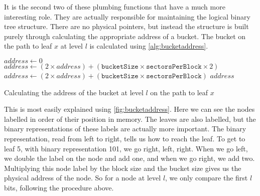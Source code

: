 \documentclass[12pt,a4paper,twoside,openright]{report}
\begin{document}
It is the second two of these plumbing functions that have a much more interesting role. They are actually responsible for maintaining the logical binary tree structure. There are no physical pointers, but instead the structure is built purely through calculating the appropriate address of a bucket. The bucket on the path to leaf $x$ at level $l$ is calculated using \cref{alg:bucketaddress}.

\begin{algorithm}[H]
  \begin{algorithmic}
  \vskip 10pt
      \State $address \gets 0$
          \State $address \gets (2 \times address) + (\mathtt{bucketSize} \times \mathtt{sectorsPerBlock} \times 2)$
        \Else
          \State $address \gets (2 \times address) + (\mathtt{bucketSize} \times \mathtt{sectorsPerBlock})$
        \EndIf
      \EndFor
      \State \Return $address$
    \EndFunction
  \vskip 10pt
  \end{algorithmic}
  \caption{Calculating the address of the bucket at level $l$ on the path to leaf $x$}
  \label{alg:bucketaddress}
\end{algorithm}

This is most easily explained using \cref{fig:bucketaddress}. Here we can see the nodes labelled in order of their position in memory. The leaves are also labelled, but the binary representations of these labels are actually more important. The binary representation, read from left to right, tells us how to reach the leaf. To get to leaf 5, with binary representation 101, we go right, left, right. When we go left, we double the label on the node and add one, and when we go right, we add two. Multiplying this node label by the block size and the bucket size gives us the physical address of the node. So for a node at level $l$, we only compare the first $l$ bits, following the procedure above.
\end{document}
